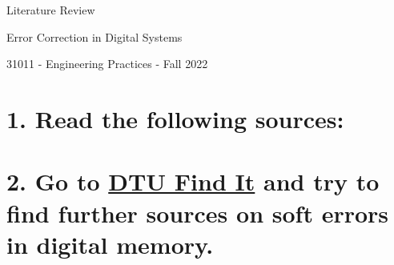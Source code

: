 \documentclass[a4paper]{article}
\begin{document}
    

\begin{center}
    {\LARGE Literature Review\par}
    {\Large Error Correction in Digital Systems\par}
    {\large 31011 - Engineering Practices - Fall 2022\par}
\end{center}

\nocite{*}

\section*{1. Read the following sources:}

\printbibliography[heading=none]

\section*{2. Go to \href{https://findit.dtu.dk}{DTU Find It} and try to find further sources on soft errors in digital memory.}
\end{document}
